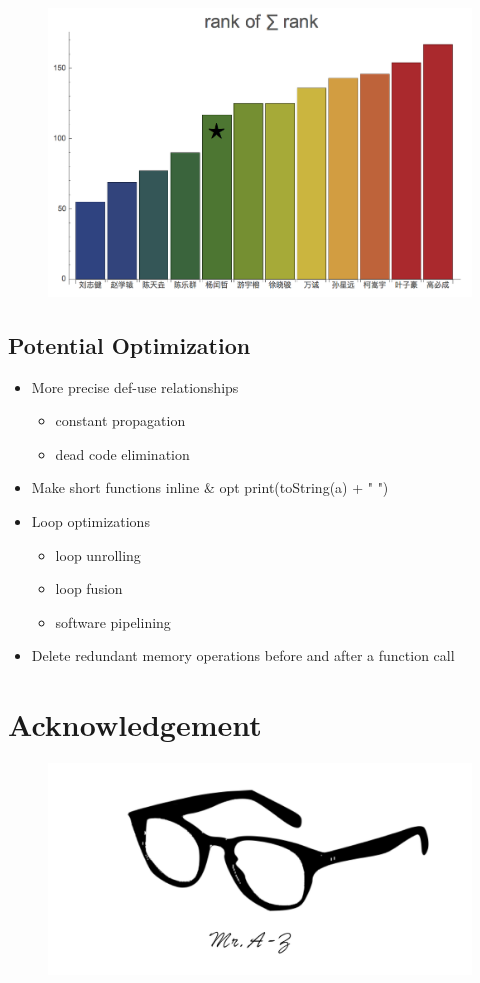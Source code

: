 \documentclass{beamer}
\begin{document}
\begin{frame}
	\begin{figure}
		\centering
		\includegraphics[width = \textwidth]{rankofrank.png}
	\end{figure}
\end{frame}

\subsection{Potential Optimization}
\begin{frame}
	\begin{itemize}
		\item More precise def-use relationships
			\begin{itemize}
				\item constant propagation
				\item dead code elimination
			\end{itemize}
		\item Make short functions inline \& opt print(toString(a) + " ")
		\item Loop optimizations
			\begin{itemize}
				\item loop unrolling
				\item loop fusion
				\item software pipelining
			\end{itemize}
		\item Delete redundant memory operations before and after a function call
	\end{itemize}
\end{frame}

\section{Acknowledgement}
\begin{frame}
	\begin{figure}
		\centering
		\includegraphics[width = \textwidth]{end_1}
	\end{figure}
\end{frame}
\end{document}
